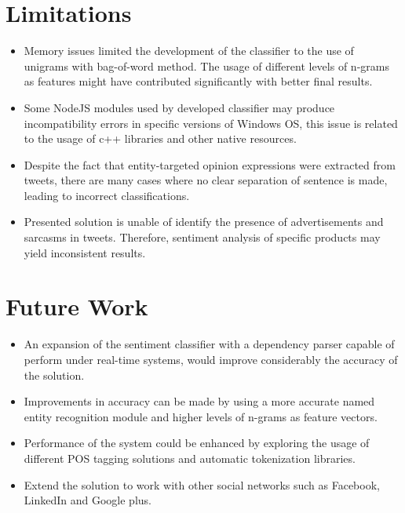 \section{Limitations}

\begin{itemize} 
\itemsep0em  

\item Memory issues limited the development of the classifier to the use of unigrams with bag-of-word method. The usage of different levels of n-grams as features might have contributed significantly with better final results.

\item Some NodeJS modules used by developed classifier may produce incompatibility errors in specific versions of Windows OS, this issue is related to the usage of c++ libraries and other native resources.

\item Despite the fact that entity-targeted opinion expressions were extracted from tweets, there are many cases where no clear separation of sentence is made, leading to incorrect classifications.  

\item Presented solution is unable of identify the presence of advertisements and sarcasms in tweets. Therefore, sentiment analysis of specific products may yield inconsistent results.  


\end{itemize}

\section{Future Work}

\begin{itemize} 
\itemsep0em  

\item An expansion of the sentiment classifier with a dependency parser capable of perform under real-time systems, would improve considerably the accuracy of the solution.   

\item Improvements in accuracy can be made by using a more accurate named entity recognition module and higher levels of n-grams as feature vectors.

\item Performance of the system could be enhanced by exploring the usage of different POS tagging solutions and automatic tokenization libraries.  

\item Extend the solution to work with other social networks such as Facebook, LinkedIn and Google plus.  


\end{itemize}